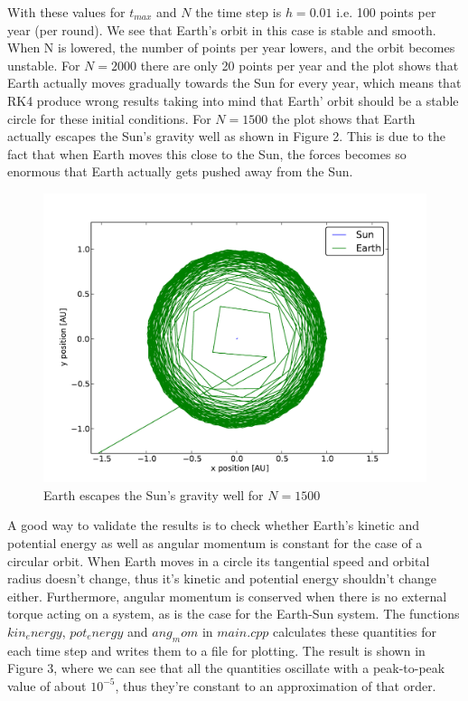 \documentclass[a4paper,12pt, english]{article}
\begin{document}
With these values for $t_{max}$ and $N$ the time step is $h = 0.01$ i.e. 100 points per year (per round). We see that Earth's orbit in this case is stable and smooth. When N is lowered, the number of points per year lowers, and the orbit becomes unstable. For $N = 2000$ there are only 20 points per year and the plot shows that Earth actually moves gradually towards the Sun for every year, which means that RK4 produce wrong results taking into mind that Earth' orbit should be a stable circle for these initial conditions. For $N = 1500$ the plot shows that Earth actually escapes the Sun's gravity well as shown in Figure 2. This is due to the fact that when Earth moves this close to the Sun, the forces becomes so enormous that Earth actually gets pushed away from the Sun. 

\begin{figure}[!h]
\centering
\includegraphics[scale = 0.5]{Fig2.pdf}
\caption{Earth escapes the Sun's gravity well for $N=1500$}
\end{figure} 

A good way to validate the results is to check whether Earth's kinetic and potential energy as well as angular momentum is constant for the case of a circular orbit. When Earth moves in a circle its tangential speed and orbital radius doesn't change, thus it's kinetic and potential energy shouldn't change either. Furthermore, angular momentum is conserved when there is no external torque acting on a system, as is the case for the Earth-Sun system. The functions $kin_energy$, $pot_energy$ and $ang_mom$ in $main.cpp$ calculates these quantities for each time step and writes them to a file for plotting. The result is shown in Figure 3, where we can see that all the quantities oscillate with a peak-to-peak value of about $10^{-5}$, thus they're constant to an approximation of that order.
\end{document}
